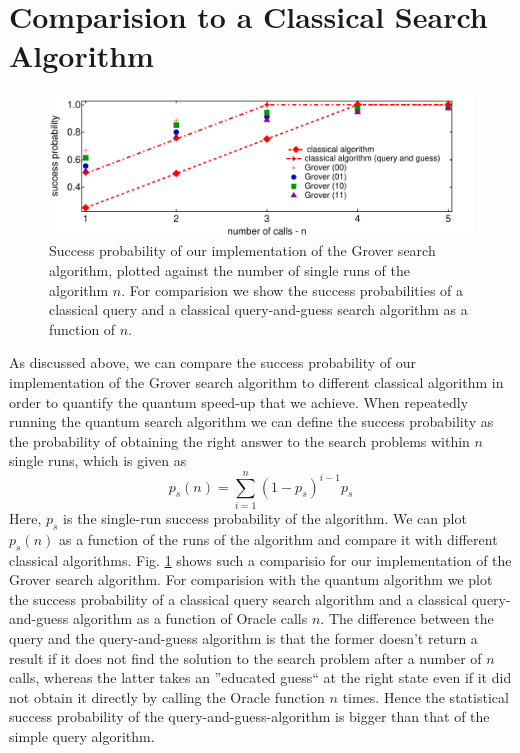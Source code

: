\section{Comparision to a Classical Search Algorithm}

\begin{figure}[h!]
	\centering
	\includegraphics[width=1\textwidth]{"./material/mathematica/comparision_grover_classical"}
	\caption[]{Success probability of our implementation of the Grover search algorithm, plotted against the number of single runs of the algorithm $n$. For comparision we show the success probabilities of a classical query and a classical query-and-guess search algorithm as a function of $n$.}
	\label{fig:comparision_grover_classical}
\end{figure}

As discussed above, we can compare the success probability of our implementation of the Grover search algorithm to different classical algorithm in order to quantify the quantum speed-up that we achieve. When repeatedly running the quantum search algorithm we can define the success probability as the probability of obtaining the right answer to the search problems within $n$ single runs, which is given as
%
\begin{equation}
p_s(n) = \sum\limits_{i=1}^n (1-p_s)^{i-1}p_s
\end{equation}
%
Here, $p_s$ is the single-run success probability of the algorithm. We can plot $p_s(n)$ as a function of the runs of the algorithm and compare it with different classical algorithms. Fig. \ref{fig:comparision_grover_classical} shows such a comparisio for our implementation of the Grover search algorithm. For comparision with the quantum algorithm we plot the success probability of a classical query search algorithm and a classical query-and-guess algorithm as a function of Oracle calls $n$. The difference between the query and the query-and-guess algorithm is that the former doesn't return a result if it does not find the solution to the search problem after a number of $n$ calls, whereas the latter takes an ''educated guess`` at the right state even if it did not obtain it directly by calling the Oracle function $n$ times. Hence the statistical success probability of the query-and-guess-algorithm is bigger than that of the simple query algorithm.

